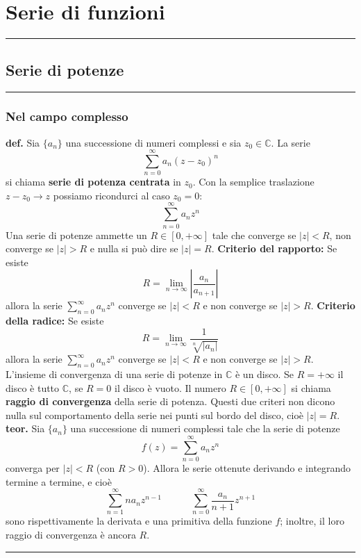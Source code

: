 \section*{Serie di funzioni}
\rule{\textwidth}{2pt}
\subsection*{Serie di potenze}
\rule{\textwidth}{0,4pt}
\subsubsection*{Nel campo complesso}
\textbf{def.} Sia $\{a_n\}$ una successione di numeri complessi e sia $z_0 \in \mathbb{C}$.\newline
La serie
\[
    \sum_{n=0}^{\infty} a_n (z-z_0)^n
\]
si chiama \textbf{serie di potenza centrata} in $z_0$.\newline
\newline
Con la semplice traslazione $z-z_0 \rightarrow z$ possiamo ricondurci al caso $z_0 = 0$:
\[
    \sum_{n=0}^{\infty}a_n z^n
\]
\newline
Una serie di potenze ammette un $R \in [0, +\infty]$ tale che converge se $|z| < R$, non converge se $|z| > R$ e nulla si può dire se $|z| = R$.\newline
\newline
\textbf{Criterio del rapporto:} Se esiste
\[
    R = \lim_{n\rightarrow \infty}\left| \frac{a_n}{a_{n+1}}\right|
\]
allora la serie $\sum_{n=0}^{\infty}a_n z^n$ converge se $|z|< R$ e non converge se $|z|> R$.\newline
\newline
\textbf{Criterio della radice:} Se esiste
\[
    R = \lim_{n\rightarrow \infty} \frac{1}{\sqrt[n]{|a_n|}}
\]
allora la serie $\sum_{n=0}^{\infty}a_n z^n$ converge se $|z| < R$ e non converge se $|z|> R$.\newline
\newline
L'insieme di convergenza di una serie di potenze in $\mathbb{C}$ è un disco.\newline
Se $R = +\infty$ il disco è tutto $\mathbb{C}$, se $R = 0$ il disco è vuoto. Il numero $R \in [0, + \infty]$ si chiama \textbf{raggio di convergenza} della serie di potenza.\newline
\newline
Questi due criteri non dicono nulla sul comportamento della serie nei punti sul bordo del disco, cioè $|z| = R$.\newline
\newline
\textbf{teor.} Sia $\{a_n\}$ una successione di numeri complessi tale che la serie di potenze
\[
    f(z) = \sum_{n=0}^{\infty} a_n z^n
\]
converga per $|z|<R$ (con $R> 0$). Allora le serie ottenute derivando e integrando termine a termine, e cioè
\[
    \sum_{n=1}^{\infty} n a_n z^{n-1} \quad \quad \quad \sum_{n=0}^{\infty} \frac{a_n}{n+1} z^{n+1}
\]
sono rispettivamente la derivata e una primitiva della funzione $f$; inoltre, il loro raggio di convergenza è ancora $R$.\newline
\newline
\rule{\textwidth}{0,4pt}
